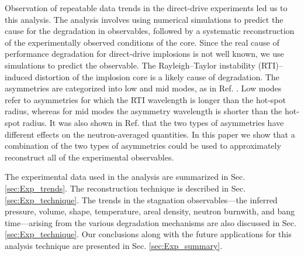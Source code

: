 \documentclass[aip,reprint]{revtex4-1}
\begin{document}
Observation of repeatable data trends in the direct-drive experiments led us to this analysis. The analysis involves using numerical simulations to predict the cause for the degradation in observables, followed by a systematic reconstruction of the experimentally observed conditions of the core. Since the real cause of performance degradation for direct-drive implosions is not well known, we use simulations to predict the observable. The Rayleigh--Taylor instability (RTI)--induced distortion of the implosion core is a likely cause of degradation. The asymmetries are categorized into low and mid modes, as in Ref. . Low modes refer to asymmetries for which the RTI wavelength is longer than the hot-spot radius, whereas for mid modes the asymmetry wavelength is shorter than the hot-spot radius. It was also shown in Ref.  that the two types of asymmetries have different effects on the neutron-averaged quantities. In this paper we show that a combination of the two types of asymmetries could be used to approximately reconstruct all of the experimental observables.

 The experimental data used in the analysis are summarized in Sec. \ref{sec:Exp_trends}. The reconstruction technique is described in Sec. \ref{sec:Exp_technique}. The trends in the stagnation observables---the inferred pressure, volume, shape, temperature, areal density, neutron burnwith, and bang time---arising from the various degradation mechanisms are also discussed in Sec. \ref{sec:Exp_technique}. Our conclusions along with the future applications for this analysis technique are presented in Sec. \ref{sec:Exp_summary}.
%
%
\end{document}
